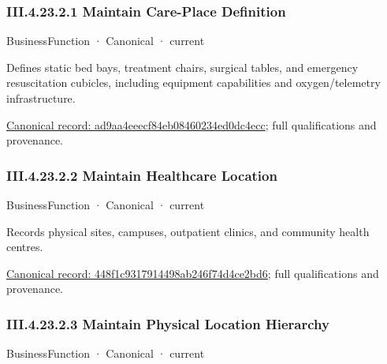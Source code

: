 \subsubsection*{III.4.23.2.1 Maintain Care-Place Definition}
\label{navigation:III.4.23.2.1}

\label{element:ad9aa4eeecf84eb08460234ed0dc4ecc}
{\small BusinessFunction · Canonical · current}\par

Defines static bed bays, treatment chairs, surgical tables, and emergency resuscitation cubicles, including equipment capabilities and oxygen/telemetry infrastructure.


{\footnotesize \href{../../../../continuum/business/business-function/ad9aa4eeecf84eb08460234ed0dc4ecc.md}{Canonical record: ad9aa4eeecf84eb08460234ed0dc4ecc}; full qualifications and provenance.}\par
\subsubsection*{III.4.23.2.2 Maintain Healthcare Location}
\label{navigation:III.4.23.2.2}

\label{element:448f1c9317914498ab246f74d4ce2bd6}
{\small BusinessFunction · Canonical · current}\par

Records physical sites, campuses, outpatient clinics, and community health centres.


{\footnotesize \href{../../../../continuum/business/business-function/448f1c9317914498ab246f74d4ce2bd6.md}{Canonical record: 448f1c9317914498ab246f74d4ce2bd6}; full qualifications and provenance.}\par
\subsubsection*{III.4.23.2.3 Maintain Physical Location Hierarchy}
\label{navigation:III.4.23.2.3}

\label{element:d217a5cd3a3d40e9a89068d1680ec45f}
{\small BusinessFunction · Canonical · current}\par

